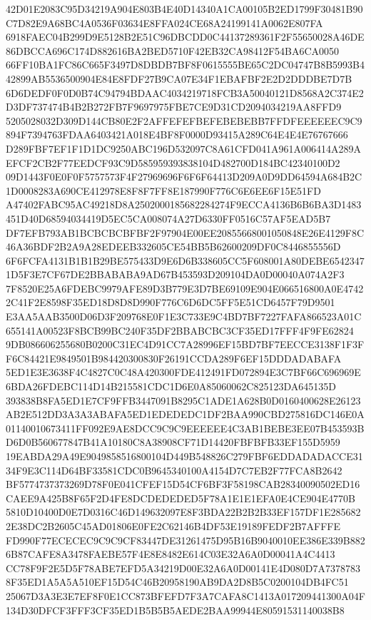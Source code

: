 \documentclass[UTF8,fontset=fandol,zihao=-4,a4paper]{ctexart}
\begin{document}
{{42D01E2083C95D34219A904E803B4E40D14340A1CA00105B2ED1799F30481B90C7D82E9A68BC4A0536F03634E8FFA024CE68A24199141A0062E807FA
6918FAEC04B299D9E5128B2E51C96DBCDD0C44137289361F2F55650028A46DE86DBCCA696C174D882616BA2BED5710F42EB32CA98412F54BA6CA0050
66FF10BA1FC86C665F3497D8DBDB7BF8F0615555BE65C2DC04747B8B5993B442899AB5536500904E84E8FDF27B9CA07E34F1EBAFBF2E2D2DDDBE7D7B
6D6DEDF0F0D0B74C94794BDAAC4034219718FCB3A50040121D8568A2C374E2D3DF737474B4B2B272FB7F9697975FBE7CE9D31CD2094034219AA8FFD9
5205028032D309D144CB80E2F2AFFEFEFBEFEBEBEBB7FFDFEEEEEEC9C9894F7394763FDAA6403421A018E4BF8F0000D93415A289C64E4E4E76767666
D289FBF7EF1F1D1DC9250ABC196D532097C8A61CFD041A961A006414A289AEFCF2CB2F77EEDCF93C9D585959393838104D482700D184BC42340100D2
09D1443F0E0F0F5757573F4F27969696F6F6F64413D209A0D9DD64594A684B2C1D0008283A690CE412978E8F8F7FF8E187990F776C6E6EE6F15E51FD
A47402FABC95AC49218D8A2502000185682284274F9ECCA4136B6B6BA3D1483451D40D68594034419D5EC5CA008074A27D6330FF0516C57AF5EAD5B7
DF7EFB793AB1BCBCBCBFBF2F97904E00EE20855668001050848E26E4129F8C46A36BDF2B2A9A28EDEEB332605CE54BB5B62600209DF0C8446855556D
6F6FCFA4131B1B1B29BE575433D9E6D6B338605CC5F608001A80DEBE65423471D5F3E7CF67DE2BBABABA9AD67B453593D209104DA0D00040A074A2F3
7F8520E25A6FDEBC9979AFE89D3B779E3D7BE69109E904E066516800A0E47422C41F2E8598F35ED18D8D8D990F776C6D6DC5FF5E51CD6457F79D9501
E3AA5AAB3500D06D3F209768E0F1E3C733E9C4BD7BF7227FAFA866523A01C655141A00523F8BCB99BC240F35DF2BBABCBC3CF35ED17FFF4F9FE62824
9DB086606255680B0200C31EC4D91CC7A28996EF15BD7BF7EECCE3138F1F3FF6C84421E9849501B984420300830F26191CCDA289F6EF15DDDADABAFA
5ED1E3E3638F4C4827C0C48A420300FDE412491FD072894E3C7BF66C696969E6BDA26FDEBC114D14B215581CDC1D6E0A85060062C825123DA645135D
393838B8FA5ED1E7CF9FFB3447091B8295C1ADE1A628B0D0160400628E26123AB2E512DD3A3A3ABAFA5ED1EDEDEDC1DF2BAA990CBD275816DC146E0A
01140010673411FF092E9AE8DCC9C9C9EEEEEE4C3AB1BEBE3EE07B453593BD6D0B560677847B41A10180C8A38908CF71D14420FBFBFB33EF155D5959
19EABDA29A49E9049858516800104D449B548826C279FBF6EDDADADACCE3134F9E3C114D64BF33581CDC0B9645340100A4154D7C7EB2F77FCA8B2642
BF5774737373269D78F0E041CFEF15D54CF6BF3F58198CAB28340090502ED16CAEE9A425B8F65F2D4FE8DCDEDEDED5F78A1E1E1EFA0E4CE904E4770B
5810D10400D0E7D0316C46D149632097E8F3BDA22B2B2B33EF157DF1E2856822E38DC2B2605C45AD01806E0FE2C62146B4DF53E19189FEDF2B7AFFFE
FD990F77ECECEC9C9C9CF83447DE31261475D95B16B9040010EE386E339B8826B87CAFE8A3478FAEBE57F4E8E8482E614C03E32A6A0D00041A4C4413
CC78F9F2E5D5F78ABE7EFD5A34219D00E32A6A0D00141E4D080D7A73787838F35ED1A5A5A510EF15D54C46B20958190AB9DA2D8B5C0200104DB4FC51
25067D3A3E3E7EF8F0E1CC873BFEFD7F3A7CAFA8C1413A017209441300A04F134D30DFCF3FFF3CF35ED1B5B5B5AEDE2BAA99944E80591531140038B8
}}
\end{document}
